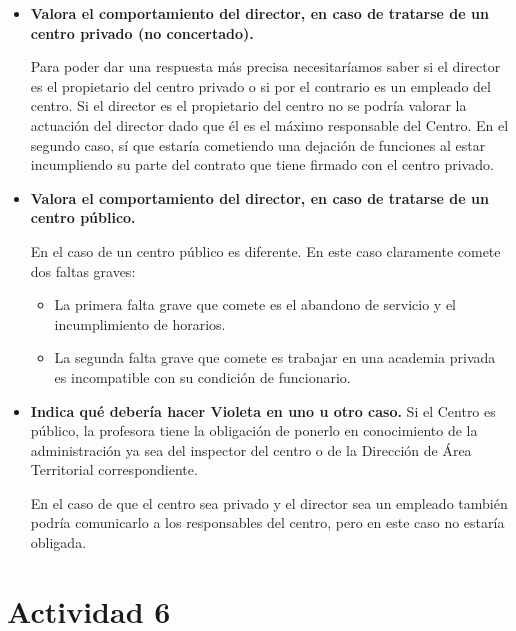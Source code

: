 \begin{itemize}
\item \textbf{Valora el comportamiento del director, en caso de tratarse de un centro privado (no concertado).
}

Para poder dar una respuesta más precisa necesitaríamos saber si el director es el propietario del centro privado o si por el contrario es un empleado del centro.
 Si el director es el propietario del centro no se podría valorar la actuación del director dado que él es el máximo responsable del Centro.
 En el segundo caso, sí que estaría cometiendo una dejación de funciones al estar incumpliendo su parte del contrato que tiene firmado con el centro privado.



\item \textbf{Valora el comportamiento del director, en caso de tratarse de un centro público.
}

En el caso de un centro público es diferente.
 En este caso claramente comete dos faltas graves:

\begin{itemize}
\item La primera falta grave que comete es el abandono de servicio y el incumplimiento de horarios.

\item La segunda falta grave que comete es trabajar en una academia privada es incompatible con su condición de funcionario.

\end{itemize}


\item \textbf{Indica qué debería hacer Violeta en uno u otro caso.
}
Si el Centro es público, la profesora tiene la obligación de ponerlo en conocimiento de la administración ya sea del inspector del centro o de la Dirección de Área Territorial correspondiente.

%
En el caso de que el centro sea privado y el director sea un empleado también podría comunicarlo a los responsables del centro, pero en este caso no estaría obligada.


\end{itemize}


\section{Actividad 6}

